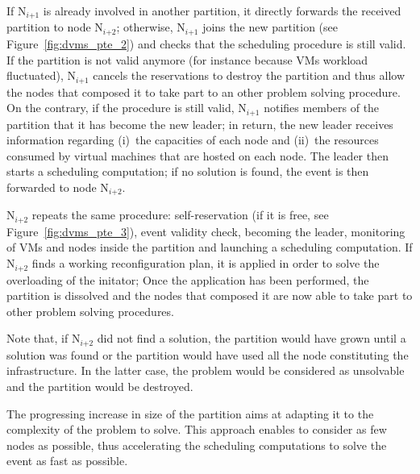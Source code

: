 If N\(_{\textit{i+1}}\) is already involved in another partition, it directly
forwards the received partition to node N\(_{\textit{i+2}}\); otherwise, 
N\(_{\textit{i+1}}\) joins the new partition (see Figure~\ref{fig:dvms_pte_2}) 
and checks that the scheduling procedure is still valid.  If the partition is 
not valid anymore (for instance because VMs workload fluctuated), 
N\(_{\textit{i+1}}\) cancels the reservations to destroy 
the partition and thus allow the nodes that composed it to take part to an other 
problem solving procedure.
%
On the contrary, if the procedure is still valid, N\(_{\textit{i+1}}\) notifies 
members of the partition that it has become the new leader; in return, the new 
leader receives information regarding (i)~the capacities of each node and 
(ii)~the resources consumed by virtual machines that are hosted on each node.  
The leader then starts a scheduling computation; if no solution is found, the 
event is then forwarded to node N\(_{\textit{i+2}}\).

N\(_{\textit{i+2}}\) repeats the same procedure: self-reservation
(if it is free, see Figure~\ref{fig:dvms_pte_3}), event validity check, becoming
the leader, monitoring of VMs and nodes inside the partition and launching a 
scheduling computation.  If N\(_{\textit{i+2}}\) finds a working reconfiguration
plan, it is applied in order to solve the overloading of the initator; Once the
application has been performed, the partition is dissolved and the nodes that 
composed it are now able to take part to other problem solving procedures.

Note that, if N\(_{\textit{i+2}}\) did not find a solution, the partition would
have grown until a solution was found or the partition would have used all the
node constituting the infrastructure. In the latter case, the problem would be 
considered as unsolvable and the partition would be destroyed.

The progressing increase in size of the partition aims at adapting it to the
complexity of the problem to solve.
This approach enables to consider as few nodes as possible, thus accelerating
the scheduling computations to solve the event as fast as possible.


